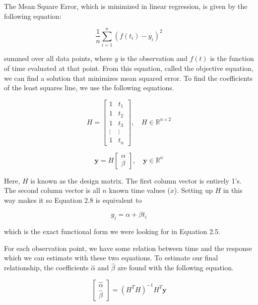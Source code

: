 The Mean Square Error, which is minimized in linear regression, is given by the following equation:

\begin{equation}
    \frac{1}{n}\sum_{i=1}^{n} (f(t_{i}) - y_{i})^2
\end{equation}

summed over all data points, where $y$ is the observation and $f(t)$ is the function of time evaluated at that point. From this equation, called the objective equation, we can find a solution that minimizes mean squared error. To find the coefficients of the least squares line, we use the following equations. 

\begin{equation}
H
=
\begin{bmatrix}
1 & t_{1} \\
1 & t_{2} \\
1 & t_{3} \\
\vdots & \vdots \\
1 & t_{n} 
\end{bmatrix}, \quad H\in\mathbb{R}^{n\times2}
\end{equation}

\begin{equation}
\bm{y}
=
H
\begin{bmatrix}
\alpha \\
\beta
\end{bmatrix}, \quad \bm{y}\in\mathbb{R}^n
\end{equation}

Here, $H$ is known as the design matrix. The first column vector is entirely 1's. The second column vector is all $n$ known time values ($x$). Setting up $H$ in this way makes it so Equation 2.8 is equivalent to 

\begin{equation}
    y_{i} = \alpha + \beta t_{i}
\end{equation}

which is the exact functional form we were looking for in Equation 2.5.

For each observation point, we have some relation between time and the response which we can estimate with these two equations. To estimate our final relationship, the coefficients $\hat{\alpha}$ and $\hat{\beta}$ are found with the following equation.

\begin{equation}
\begin{bmatrix}
\hat{\alpha} \\
\hat{\beta}
\end{bmatrix}
=
(H^{T}H)^{-1}H^{T}\bm{y}
\end{equation}

